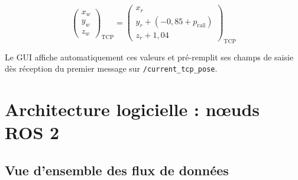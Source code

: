 \documentclass[11pt, a4paper]{article}
\newcommand{\topic}[1]{\texttt{\color{AccentOrange}#1}}
\begin{document}
\begin{equation}
  \begin{pmatrix} x_w \\ y_w \\ z_w \end{pmatrix}_{\text{TCP}}
  =
  \begin{pmatrix} x_r \\ y_r + (-0{,}85 + p_{\text{rail}}) \\ z_r + 1{,}04 \end{pmatrix}_{\text{TCP}}
\end{equation}

Le GUI affiche automatiquement ces valeurs et pré-remplit ses champs de saisie dès réception du premier message sur \topic{/current\_tcp\_pose}.

\section{Architecture logicielle : nœuds ROS 2}

\subsection{Vue d'ensemble des flux de données}
\end{document}
